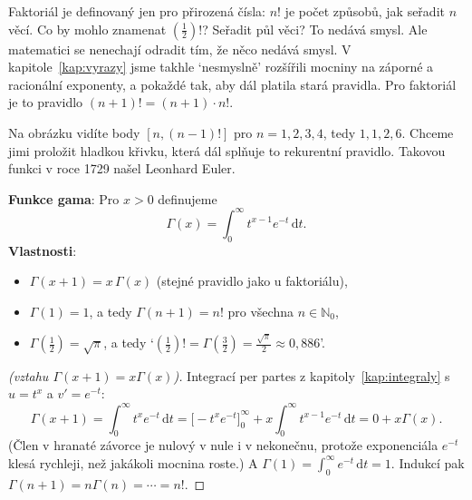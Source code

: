 Faktoriál je definovaný jen pro přirozená čísla: $n!$ je počet způsobů, jak seřadit $n$ věcí. Co by mohlo znamenat $\left(\frac{1}{2}\right)!$? Seřadit půl věci? To nedává smysl. Ale matematici se nenechají odradit tím, že něco nedává smysl. V kapitole~\ref{kap:vyrazy} jsme takhle `nesmyslně' rozšířili mocniny na záporné a racionální exponenty, a pokaždé tak, aby dál platila stará pravidla. Pro faktoriál je to pravidlo $(n + 1)! = (n + 1)\cdot n!$.

Na obrázku vidíte body $[n, (n-1)!]$ pro $n = 1, 2, 3, 4$, tedy $1, 1, 2, 6$. Chceme jimi proložit hladkou křivku, která dál splňuje to rekurentní pravidlo. Takovou funkci v roce 1729 našel Leonhard Euler.

\begin{definitionbox}
  \textbf{Funkce gama}: Pro $x > 0$ definujeme
  \begin{equation*}
    \Gamma(x) = \int_0^{\infty} t^{x-1}e^{-t}\,\mathrm{d}t.
  \end{equation*}
  \textbf{Vlastnosti}:
  \begin{itemize}
    \item $\Gamma(x + 1) = x\,\Gamma(x)$ (stejné pravidlo jako u faktoriálu),
    \item $\Gamma(1) = 1$, a tedy $\Gamma(n + 1) = n!$ pro všechna $n\in\mathbb{N}_0$,
    \item $\Gamma\left(\frac{1}{2}\right) = \sqrt{\pi}$, a tedy `$\left(\frac{1}{2}\right)! = \Gamma\left(\frac{3}{2}\right) = \frac{\sqrt{\pi}}{2}\approx 0{,}886$'.
  \end{itemize}
\end{definitionbox}

\begin{proof}[(vztahu $\Gamma(x + 1) = x\Gamma(x)$)]
  Integrací per partes z kapitoly~\ref{kap:integraly} s $u = t^x$ a $v' = e^{-t}$:
  \begin{equation*}
    \Gamma(x + 1) = \int_0^{\infty}t^xe^{-t}\,\mathrm{d}t = {\big[-t^xe^{-t}\big]}_0^{\infty} + x\int_0^{\infty}t^{x-1}e^{-t}\,\mathrm{d}t = 0 + x\Gamma(x).
  \end{equation*}
  (Člen v hranaté závorce je nulový v nule i v nekonečnu, protože exponenciála $e^{-t}$ klesá rychleji, než jakákoli mocnina roste.) A $\Gamma(1) = \int_0^\infty e^{-t}\,\mathrm{d}t = 1$. Indukcí pak $\Gamma(n + 1) = n\Gamma(n) = \cdots = n!$.
\end{proof}

